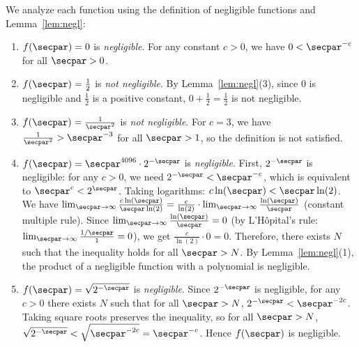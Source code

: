 \ifsolutions
\begin{mysolution}
  We analyze each function using the definition of negligible functions and Lemma~\ref{lem:negl}:
  \begin{enumerate}
    \item $f(\secpar) = 0$ is \emph{negligible}.
    For any constant $c > 0$, we have $0 < \secpar^{-c}$ for all $\secpar > 0$.
    
    \item $f(\secpar) = \frac{1}{2}$ is \emph{not negligible}.
    By Lemma~\ref{lem:negl}(3), since $0$ is negligible and $\frac{1}{2}$ is a positive constant, $0 + \frac{1}{2} = \frac{1}{2}$ is not negligible.
    
    \item $f(\secpar) = \frac{1}{\secpar^2}$ is \emph{not negligible}.
    For $c = 3$, we have $\frac{1}{\secpar^2} > \secpar^{-3}$ for all $\secpar > 1$, so the definition is not satisfied.
    
    \item $f(\secpar) = \secpar^{4096} \cdot 2^{-\secpar}$ is \emph{negligible}.
    First, $2^{-\secpar}$ is negligible: for any $c > 0$, we need $2^{-\secpar} < \secpar^{-c}$, which is equivalent to $\secpar^c < 2^{\secpar}$.
    Taking logarithms: $c \ln(\secpar) < \secpar \ln(2)$.
    We have $\lim_{\secpar \to \infty} \frac{c \ln(\secpar)}{\secpar \ln(2)} = \frac{c}{\ln(2)} \cdot \lim_{\secpar \to \infty} \frac{\ln(\secpar)}{\secpar}$ (constant multiple rule).
    Since $\lim_{\secpar \to \infty} \frac{\ln(\secpar)}{\secpar} = 0$ (by L'Hôpital's rule: $\lim_{\secpar \to \infty} \frac{1/\secpar}{1} = 0$), we get $\frac{c}{\ln(2)} \cdot 0 = 0$.
    Therefore, there exists $N$ such that the inequality holds for all $\secpar > N$.
    By Lemma~\ref{lem:negl}(1), the product of a negligible function with a polynomial is negligible.
    
    \item $f(\secpar) = \sqrt{2^{-\secpar}}$ is \emph{negligible}.
    Since $2^{-\secpar}$ is negligible, for any $c > 0$ there exists $N$ such that for all $\secpar > N$,
    $2^{-\secpar} < \secpar^{-2c}$.
    Taking square roots preserves the inequality, so for all $\secpar > N$,
    $\sqrt{2^{-\secpar}} < \sqrt{\secpar^{-2c}} = \secpar^{-c}$.
    Hence $f(\secpar)$ is negligible.
  \end{enumerate}
\end{mysolution}
\fi

